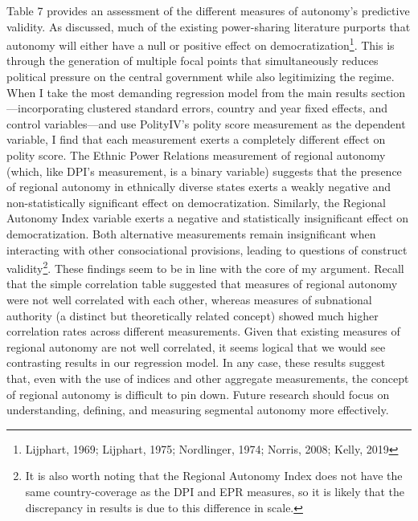 \documentclass[12pt]{article}
\begin{document}
Table 7 provides an assessment of the different measures of autonomy's predictive validity. As discussed, much of the existing power-sharing literature purports that autonomy will either have a null or positive effect on democratization\footnote{Lijphart, 1969; Lijphart, 1975; Nordlinger, 1974; Norris, 2008; Kelly, 2019}. This is through the generation of multiple focal points that simultaneously reduces political pressure on the central government while also legitimizing the regime. When I take the most demanding regression model from the main results section---incorporating clustered standard errors, country and year fixed effects, and control variables---and use PolityIV's polity score measurement as the dependent variable, I find that each measurement exerts a completely different effect on polity score. The Ethnic Power Relations measurement of regional autonomy (which, like DPI's measurement, is a binary variable) suggests that the presence of regional autonomy in ethnically diverse states exerts a weakly negative and non-statistically significant effect on democratization. Similarly, the Regional Autonomy Index variable exerts a negative and statistically insignificant effect on democratization. Both alternative measurements remain insignificant when interacting with other consociational provisions, leading to questions of construct validity\footnote{It is also worth noting that the Regional Autonomy Index does not have the same country-coverage as the DPI and EPR measures, so it is likely that the discrepancy in results is due to this difference in scale.}. These findings seem to be in line with the core of my argument. Recall that the simple correlation table suggested that measures of regional autonomy were not well correlated with each other, whereas measures of subnational authority (a distinct but theoretically related concept) showed much higher correlation rates across different measurements. Given that existing measures of regional autonomy are not well correlated, it seems logical that we would see contrasting results in our regression model. In any case, these results suggest that, even with the use of indices and other aggregate measurements, the concept of regional autonomy is difficult to pin down. Future research should focus on understanding, defining, and measuring segmental autonomy more effectively.  
\end{document}
